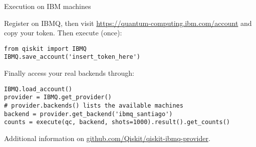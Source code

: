 \begin{frame}[fragile]{Execution on IBM machines}

Register on IBMQ, then visit \url{https://quantum-computing.ibm.com/account} and copy your token. Then execute (once): \medskip

\begin{verbatim}
from qiskit import IBMQ
IBMQ.save_account('insert_token_here')
\end{verbatim}

\medskip Finally access your real backends through:\medskip

\begin{verbatim}
IBMQ.load_account()
provider = IBMQ.get_provider()
# provider.backends() lists the available machines
backend = provider.get_backend('ibmq_santiago')
counts = execute(qc, backend, shots=1000).result().get_counts()
\end{verbatim}

\medskip Additional information on \url{github.com/Qiskit/qiskit-ibmq-provider}. 
\end{frame}